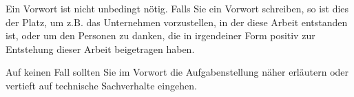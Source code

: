 \preface

Ein Vorwort ist nicht unbedingt nötig. Falls Sie ein Vorwort schreiben, so ist dies der Platz, um z.B. das Unternehmen vorzustellen, in der diese Arbeit entstanden ist, oder um den Personen zu danken, die in irgendeiner Form positiv zur Entstehung dieser Arbeit beigetragen haben.

Auf keinen Fall sollten Sie im Vorwort die Aufgabenstellung näher erläutern oder vertieft auf technische Sachverhalte eingehen.
